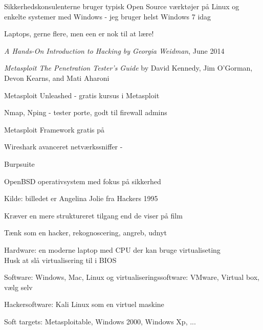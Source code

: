 \documentclass[20pt,landscape,a4paper]{foils}
\begin{document}
\begin{list1}
\item Sikkerhedskonsulenterne bruger typisk Open Source værktøjer på Linux og
enkelte systemer med Windows - jeg bruger helst Windows 7 idag
\item Laptops, gerne flere, men een er nok til at lære!
\begin{list2}
\item \emph{A Hands-On Introduction to Hacking
by Georgia Weidman}, June 2014\\
\item \emph{Metasploit The Penetration Tester's Guide}
by David Kennedy, Jim O'Gorman, Devon Kearns, and Mati Aharoni\\
\item Metasploit Unleashed - gratis kursus i Metasploit\\
\end{list2}
\end{list1}



\begin{list2}
\item Nmap, Nping - tester porte, godt til firewall admins 
\item Metasploit Framework gratis på 
\item Wireshark avanceret netværkssniffer - 
\item Burpsuite 
\item OpenBSD operativsystem med fokus
  på sikkerhed  
\end{list2}

Kilde: billedet er Angelina Jolie fra Hackers 1995

\centerline{Kræver en mere struktureret tilgang end de viser på film \smiley}



\begin{list2}
\item Tænk som en hacker, rekognoscering, angreb, udnyt
\item Hardware: en moderne laptop med CPU der kan bruge virtualiseting\\
Husk at slå virtualisering til i BIOS
\item Software: Windows, Mac, Linux og virtualiseringssoftware: VMware, Virtual box, vælg selv
\item Hackersoftware: Kali Linux som en virtuel maskine
\item Soft targets: Metasploitable, Windows 2000, Windows Xp, ...
\end{list2}
\end{document}
